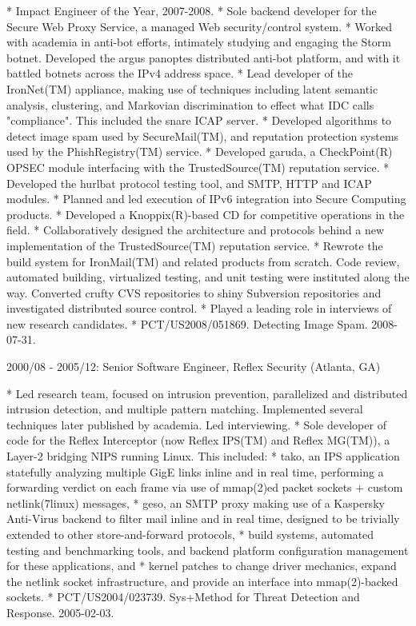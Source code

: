 \documentclass{article}
\begin{document}
* Impact Engineer of the Year, 2007-2008.
* Sole backend developer for the Secure Web Proxy Service, a managed Web
  security/control system.
* Worked with academia in anti-bot efforts, intimately studying and engaging
  the Storm botnet. Developed the argus panoptes distributed anti-bot
  platform, and with it battled botnets across the IPv4 address space.
* Lead developer of the IronNet(TM) appliance, making use of techniques
  including latent semantic analysis, clustering, and Markovian discrimination
  to effect what IDC calls "compliance". This included the snare ICAP server.
* Developed algorithms to detect image spam used by SecureMail(TM), and
  reputation protection systems used by the PhishRegistry(TM) service.
* Developed garuda, a CheckPoint(R) OPSEC module interfacing with the
  TrustedSource(TM) reputation service.
* Developed the hurlbat protocol testing tool, and SMTP, HTTP and ICAP modules.
* Planned and led execution of IPv6 integration into Secure Computing products.
* Developed a Knoppix(R)-based CD for competitive operations in the field.
* Collaboratively designed the architecture and protocols behind a new
  implementation of the TrustedSource(TM) reputation service.
* Rewrote the build system for IronMail(TM) and related products from scratch.
  Code review, automated building, virtualized testing, and unit testing were
  instituted along the way. Converted crufty CVS repositories to shiny
  Subversion repositories and investigated distributed source control.
* Played a leading role in interviews of new research candidates.
* PCT/US2008/051869. Detecting Image Spam. 2008-07-31.

2000/08 - 2005/12: Senior Software Engineer, Reflex Security (Atlanta, GA)

* Led research team, focused on intrusion prevention, parallelized and
  distributed intrusion detection, and multiple pattern matching. Implemented
  several techniques later published by academia. Led interviewing.
* Sole developer of code for the Reflex Interceptor (now Reflex IPS(TM) and
  Reflex MG(TM)), a Layer-2 bridging NIPS running Linux. This included:
    * tako, an IPS application statefully analyzing multiple GigE links inline
      and in real time, performing a forwarding verdict on each frame via use
      of mmap(2)ed packet sockets + custom netlink(7linux) messages,
    * geso, an SMTP proxy making use of a Kaspersky Anti-Virus backend to
      filter mail inline and in real time, designed to be trivially extended
      to other store-and-forward protocols,
    * build systems, automated testing and benchmarking tools, and backend
      platform configuration management for these applications, and
    * kernel patches to change driver mechanics, expand the netlink socket
      infrastructure, and provide an interface into mmap(2)-backed sockets.
* PCT/US2004/023739. Sys+Method for Threat Detection and Response. 2005-02-03.
\end{document}
